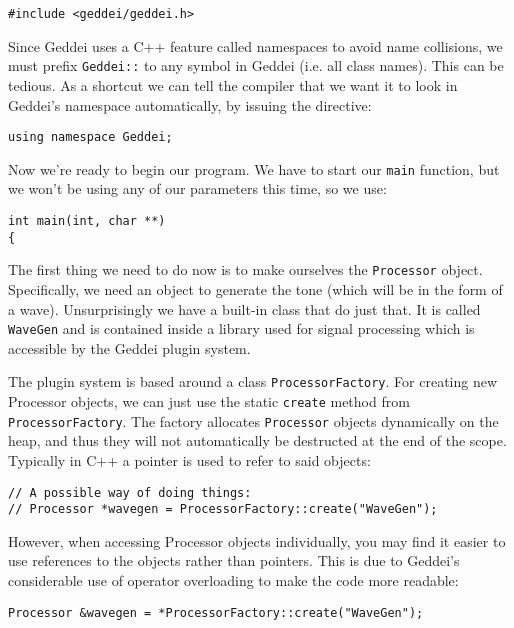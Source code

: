 \begin{verbatim}
#include <geddei/geddei.h>
\end{verbatim}

Since Geddei uses a C++ feature called namespaces to avoid name collisions, we must prefix \texttt{Geddei::} to any symbol in Geddei (i.e. all class names). This can be tedious. As a shortcut we can tell the compiler that we want it to look in Geddei's namespace automatically, by issuing the directive:

\begin{verbatim}
using namespace Geddei;
\end{verbatim}

Now we're ready to begin our program. We have to start our \texttt{main} function, but we won't be using any of our parameters this time, so we use:

\begin{verbatim}
int main(int, char **)
{
\end{verbatim}

The first thing we need to do now is to make ourselves the \texttt{Processor} object. Specifically, we need an object to generate the tone (which will be in the form of a wave). Unsurprisingly we have a built-in class that do just that. It is called \texttt{WaveGen} and is contained inside a library used for signal processing which is accessible by the Geddei plugin system.

The plugin system is based around a class \texttt{ProcessorFactory}. For creating new Processor objects, we can just use the static \texttt{create} method from \texttt{ProcessorFactory}. The factory allocates \texttt{Processor} objects dynamically on the heap, and thus they will not automatically be destructed at the end of the scope. Typically in C++ a pointer is used to refer to said objects:

\begin{verbatim}
// A possible way of doing things:
// Processor *wavegen = ProcessorFactory::create("WaveGen");
\end{verbatim}

However, when accessing Processor objects individually, you may find it easier to use references to the objects rather than pointers. This is due to Geddei's considerable use of operator overloading to make the code more readable:

\begin{verbatim}
Processor &wavegen = *ProcessorFactory::create("WaveGen");
\end{verbatim}

